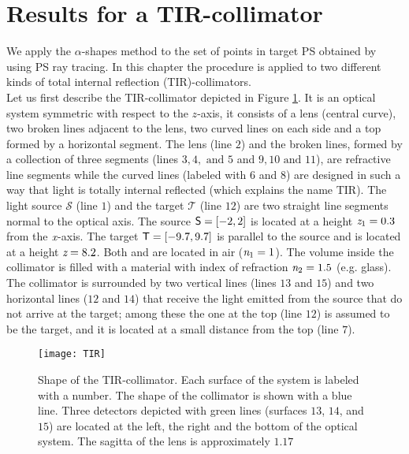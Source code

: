 \section{Results for a TIR-collimator}\label{results-Tir-alpha}
We apply the $\alpha$-shapes method to the set of points in target PS obtained by using PS ray tracing.
In this chapter the procedure is applied to two different kinds of total internal reflection (TIR)-collimators.\\ \indent  
Let us first describe the TIR-collimator depicted in Figure \ref{fig:tir}. It is an optical system symmetric with respect to the $z$-axis, it consists of a lens (central curve), two broken lines adjacent to the lens,
two curved lines on each side and a top formed by a horizontal segment. The lens (line $2$) and the broken lines, formed by a collection of three segments (lines $3, 4, \mbox{ and } 5$ and $9, 10 \mbox{ and } 11$), are refractive line segments while the curved lines (labeled with $6$ and $8$) are designed in such a way that light is totally internal reflected (which explains the name TIR).
The light source $\mathcal{S}$ (line $1$) and the target $\mathcal{T}$ (line $12$) are two straight line segments normal to the optical axis.
The source $\textsf{S}= [-2,2]$ is located at a height $\textit{z}_{1} = 0.3$ from the $\textit{x}$-axis.
 The target $\textsf{T}= [-9.7, 9.7]$ is parallel to the source and is located at a height $ \textit{z}= 8.2$. Both  and  are located in air ($\textit{n}_1=1$).
The volume inside the collimator is filled with a material with index of refraction $\textit{n}_2=1.5$ (e.g. glass).
The collimator is surrounded by two vertical lines (lines $13$ and $15$) and two horizontal lines ($12$ and $14$) that receive the light emitted from the source that do not arrive at the target; among these the one at the top (line $12$) is assumed to be the target, and it is located at a small distance from the top (line $7$). 
\begin{figure}[h]
  \begin{center}
  \texttt{[image: TIR]}
  \end{center}
  \caption{Shape of the TIR-collimator. Each surface of the system is labeled with a number.
   The shape of the collimator is shown with a blue line.
   Three detectors depicted with green lines (surfaces $13$, $14$, and $15$) are located at the left, the right and the bottom of the optical system.
The sagitta of the lens is approximately $1.17$}
  \label{fig:tir}
\end{figure}
\\ \indent
